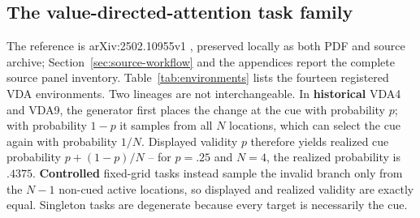 \documentclass[11pt,a4paper]{article}
\begin{document}
\subsection{The value-directed-attention task family}\label{sec:task-family}
The reference is arXiv:2502.10955v1 \cite{mah2025}, preserved locally as both PDF and source archive; Section~\ref{sec:source-workflow} and the appendices report the complete source panel inventory. Table~\ref{tab:environments} lists the fourteen registered VDA environments. Two lineages are not interchangeable. In \textbf{historical} VDA4 and VDA9, the generator first places the change at the cue with probability $p$; with probability $1-p$ it samples from all $N$ locations, which can select the cue again with probability $1/N$. Displayed validity $p$ therefore yields realized cue probability $p+(1-p)/N$ -- for $p=.25$ and $N=4$, the realized probability is $.4375$. \textbf{Controlled} fixed-grid tasks instead sample the invalid branch only from the $N-1$ non-cued active locations, so displayed and realized validity are exactly equal. Singleton tasks are degenerate because every target is necessarily the cue.
\end{document}
